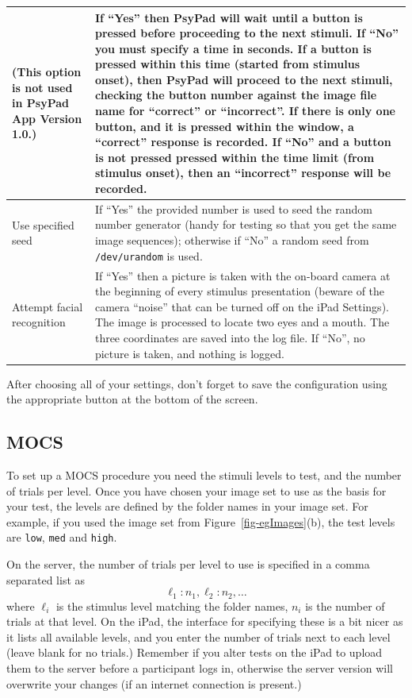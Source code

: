 \documentclass{article}
\begin{document}
\begin{longtable}{|p{5cm}|p{10cm}|}
\vspace{2ex}
(This option is not used in PsyPad App Version 1.0.) 
&
If ``Yes'' then PsyPad will wait until a button is pressed before proceeding to the next
stimuli.
If ``No'' you must specify a time in seconds. If a button is pressed 
within this time (started from stimulus onset),
then PsyPad will proceed to the next stimuli, checking the button number against the image file name for
``correct'' or ``incorrect''. If there is only one button, and it is pressed within the window, a ``correct'' response
is recorded.
If ``No'' and a button is not pressed pressed within the time limit (from stimulus onset), then 
an ``incorrect'' response will be recorded.\\
\hline
Use specified seed & If ``Yes'' the provided number is used to seed the random number generator (handy
for testing so that you get the same image sequences); otherwise if ``No'' a random seed from
{\tt /dev/urandom} is used.\\
\hline
Attempt facial recognition & If ``Yes'' then a picture is taken with the on-board camera at the
beginning of every stimulus presentation (beware of the camera ``noise'' that can be turned off on the
iPad Settings). The image is processed to locate two eyes and a mouth. The three coordinates are saved
into the log file. If ``No'', no picture is taken, and nothing is logged.\\
\hline
\end{longtable}

After choosing all of your settings, don't forget to save the configuration using the appropriate button at the bottom of the screen.

\subsection{MOCS}
\label{sec-mocs}

To set up a MOCS procedure you need the stimuli levels to test, and the
number of trials per level.
Once you have chosen your image set to use as the basis for your test,
the levels are defined by the folder names in your image set.
For example, if you used the image set from Figure~\ref{fig-egImages}(b),
the test levels are {\tt low}, {\tt med} and {\tt high}.

On the server, the number of trials per level to use is specified in 
a comma separated list as
$$
{\ell_1}{:}{n_1}{,}{\ell_2}{:}{n_2}{,}\ldots
$$
where $\ell_i$ is the stimulus level matching the folder names, $n_i$ is the number of trials at that
level.
On the iPad, the interface for specifying these is a bit nicer as it lists all available levels, and
you enter the number of trials next to each level (leave blank for no trials.)
Remember if you alter tests on the iPad to upload them to the server before a participant logs in,
otherwise the server version will overwrite your changes (if an internet connection is present.)
\end{document}
